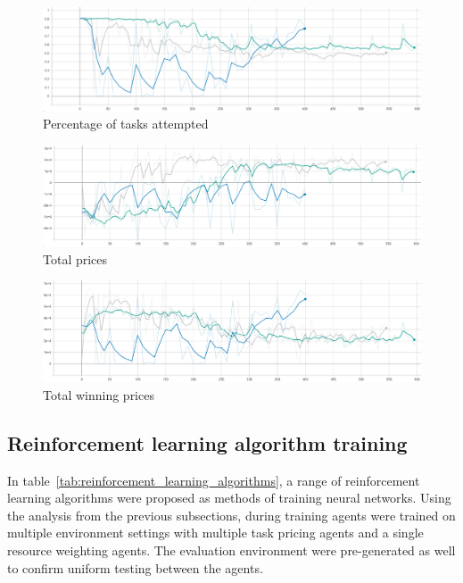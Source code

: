 \begin{figure}[H]
    \centering
    \includegraphics[width=17cm]{figures/4_test_eval_figs/env_training_fig/percent_tasks.png}
    \caption{Percentage of tasks attempted}
    \label{fig:env_percent_tasks}
\end{figure}

\begin{figure}[H]
    \centering
    \includegraphics[width=17cm]{figures/4_test_eval_figs/env_training_fig/total_prices.png}
    \caption{Total prices}
    \label{fig:env_total_prices}
\end{figure}

\begin{figure}[H]
    \centering
    \includegraphics[width=17cm]{figures/4_test_eval_figs/env_training_fig/total_winning_prices.PNG}
    \caption{Total winning prices}
    \label{fig:env_winning_prices}
\end{figure}



\subsection{Reinforcement learning algorithm training}\label{subsec:reinforcement-learning-algorithm-training}
In table~\ref{tab:reinforcement_learning_algorithms}, a range of reinforcement learning algorithms were proposed as
methods of training neural networks. Using the analysis from the previous subsections, during training agents were
trained on multiple environment settings with multiple task pricing agents and a single resource weighting agents.
The evaluation environment were pre-generated as well to confirm uniform testing between the agents. \newline

